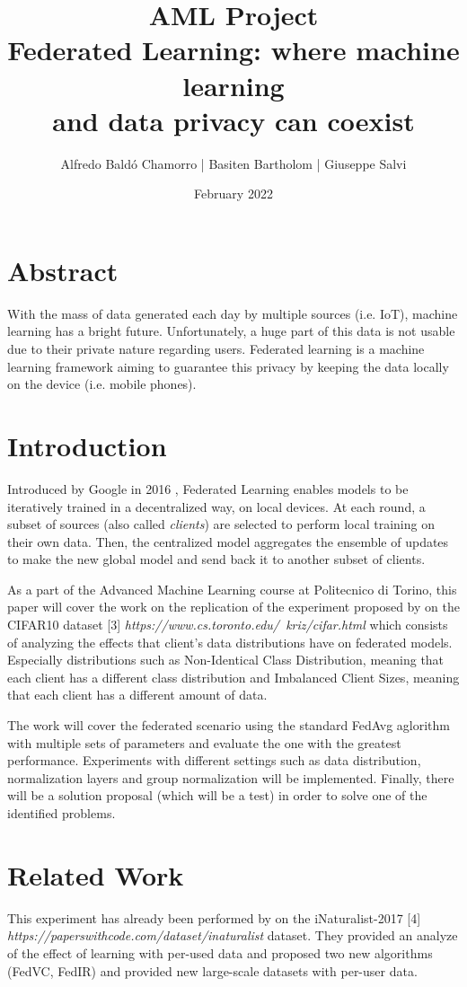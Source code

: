 \documentclass[twocolumn]{article}
\title{AML Project
\\Federated Learning: where machine learning \\and data privacy can coexist
}
\author{
Alfredo Baldó Chamorro | 
Basiten Bartholom |
Giuseppe Salvi
}
\date{February 2022}
\begin{document}
\maketitle

\section{Abstract}
With the mass of data generated each day by multiple sources (i.e. IoT), machine learning has a bright future. Unfortunately, a huge part of this data is not usable due to their private nature regarding users. Federated learning is a machine learning framework aiming to guarantee this privacy by keeping the data locally on the device (i.e. mobile phones).
\section{Introduction} %

Introduced by Google in 2016 \cite{DBLP:journals/corr/KonecnyMYRSB16}, Federated Learning enables models to be iteratively trained in a decentralized way, on local devices. At each round, a subset of sources (also called \emph{clients}) are selected to perform local training on their own data. Then, the centralized model aggregates the ensemble of updates to make the new global model and send back it to another subset of clients. 

As a part of the Advanced Machine Learning course at Politecnico di Torino, this paper will cover the work on the replication of the experiment proposed by \cite{DBLP:journals/corr/abs-2003-08082} on the CIFAR10 dataset [3] \emph{https://www.cs.toronto.edu/~kriz/cifar.html} which consists of analyzing the effects that client's data distributions have on federated models. Especially distributions such as Non-Identical Class Distribution, meaning that each client has a different class distribution and Imbalanced Client Sizes, meaning that each client has a different amount of data. 

The work will cover the federated scenario using the standard FedAvg aglorithm with multiple sets of parameters and evaluate the one with the greatest performance. Experiments with different settings such as data distribution, normalization layers and group normalization will be implemented. Finally, there will be a solution proposal (which will be a test) in order to solve one of the identified problems.

\section{Related Work} %
This experiment has already been performed by \cite{DBLP:journals/corr/abs-2003-08082}  on the iNaturalist-2017 [4] \emph{https://paperswithcode.com/dataset/inaturalist} dataset. They provided an analyze of the effect of learning with per-used data and proposed two new algorithms (FedVC, FedIR) and provided new large-scale datasets with per-user data.
\end{document}
